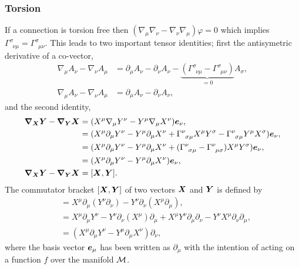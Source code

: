 \subsubsection{Torsion}
If a connection is torsion free then $(\nabla_\mu \nabla_\nu  - \nabla_\nu \nabla_\mu )\varphi=0$ which implies $\Gamma^{\sigma}_{\,\,\,\nu\mu}  = \Gamma^{\sigma}_{\,\,\,\mu\nu}$. This leads to two important tensor identities; first the antisymetric derivative of a co-vector,
\begin{align} 
\nabla_\mu A_\nu - \nabla_\nu A_\mu &= \partial_\mu A_\nu - \partial_\nu A_\nu - \underbrace{(\Gamma^\sigma_{\,\,\,\nu\mu}- \Gamma^\sigma_{\,\,\,\mu\nu})}_{=0}A_\sigma, \\
\nabla_\mu A_\nu - \nabla_\nu A_\mu &= \partial_\mu A_\nu - \partial_\nu A_\nu, 
\end{align}
and the second identity,
\begin{align} 
\boldsymbol{\nabla}_{\boldsymbol{X}} \boldsymbol{Y} - \boldsymbol{\nabla}_{\boldsymbol{Y}}\boldsymbol{X} &= (X^\mu \nabla_\mu Y^\nu - Y^\mu \nabla_\mu X^\nu ) \boldsymbol{e}_\nu, \\
&= (X^\mu \partial_\mu Y^\nu - Y^\mu \partial_\mu X^\nu  + \Gamma^\nu_{\,\,\,\sigma\mu} X^\mu Y^\sigma - \Gamma^\nu_{\,\,\,\sigma\mu} Y^\mu X^\sigma) \boldsymbol{e}_\nu, \\ 
&= (X^\mu \partial_\mu Y^\nu - Y^\mu \partial_\mu X^\nu  + (\Gamma^\nu_{\,\,\,\sigma\mu}  - \Gamma^\nu_{\,\,\,\mu\sigma}) X^\mu Y^\sigma) \boldsymbol{e}_\nu, \\ 
&= (X^\mu \partial_\mu Y^\nu - Y^\mu \partial_\mu X^\nu  ) \boldsymbol{e}_\nu, \\ \boldsymbol{\nabla}_{\boldsymbol{X}} \boldsymbol{Y} - \boldsymbol{\nabla}_{\boldsymbol{Y}}\boldsymbol{X}&= [\boldsymbol{X},\boldsymbol{Y}]. 
\end{align}
The commutator bracket $[\boldsymbol{X},\boldsymbol{Y}]$ of two vectors $\boldsymbol{X}$ and $\boldsymbol{Y}$ is defined by 
\begin{align}
[X^\mu \partial_\mu,Y^\nu \partial_\nu] &= X^\mu \partial_\mu (Y^\nu \partial_\nu) - Y^\nu \partial_\nu (X^\mu \partial_\mu) ,\\
&= X^\mu \partial_\mu Y^\nu  - Y^\nu \partial_\nu (X^\mu ) \partial_\mu + X^\mu Y^\nu \partial_\mu  \partial_\nu - Y^\nu X^\mu\partial_\nu  \partial_\mu ,\\
&= (X^\mu \partial_\mu Y^\nu  - Y^\mu \partial_\mu X^\nu ) \partial_\nu ,
\end{align}
where the basis vector $\boldsymbol{e}_\mu$ has been written as $\partial_\mu$ with the intention of acting on a function $f$ over the manifold $\mathcal{M}$.


